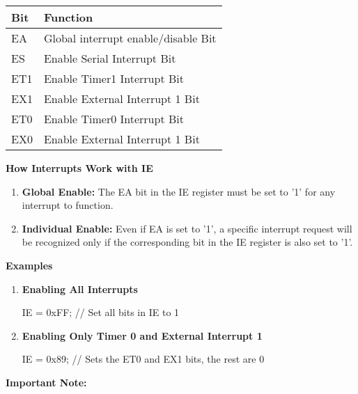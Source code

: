 \documentclass[
]{article}
\newenvironment{Shaded}{}{}
\newcommand{\NormalTok}[1]{#1}
\begin{document}
\begin{longtable}[]{@{}ll@{}}
\toprule
Bit & Function \\
\midrule
\endhead
EA & Global interrupt enable/disable Bit \\
ES & Enable Serial Interrupt Bit \\
ET1 & Enable Timer1 Interrupt Bit \\
EX1 & Enable External Interrupt 1 Bit \\
ET0 & Enable Timer0 Interrupt Bit \\
EX0 & Enable External Interrupt 1 Bit \\
\bottomrule
\end{longtable}

\textbf{How Interrupts Work with IE}

\begin{enumerate}
\def\labelenumi{\arabic{enumi}.}
\item
  \textbf{Global Enable:} The EA bit in the IE register must be set to
  '1' for any interrupt to function.
\item
  \textbf{Individual Enable:} Even if EA is set to '1', a specific
  interrupt request will be recognized only if the corresponding bit in
  the IE register is also set to '1'.
\end{enumerate}

\textbf{Examples}

\begin{enumerate}
\def\labelenumi{\arabic{enumi}.}
\item
  \textbf{Enabling All Interrupts}

\begin{Shaded}
\begin{Highlighting}[]
\NormalTok{IE = 0xFF;  // Set all bits in IE to \textquotesingle{}1\textquotesingle{}}
\end{Highlighting}
\end{Shaded}
\item
  \textbf{Enabling Only Timer 0 and External Interrupt 1}

\begin{Shaded}
\begin{Highlighting}[]
\NormalTok{IE = 0x89;  // Sets the ET0 and EX1 bits, the rest are \textquotesingle{}0\textquotesingle{}}
\end{Highlighting}
\end{Shaded}
\end{enumerate}

\textbf{Important Note:}
\end{document}
